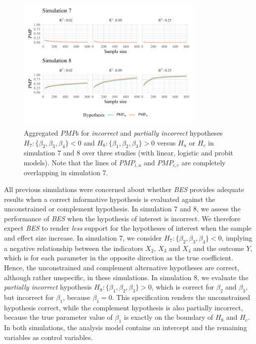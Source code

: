 \documentclass[
  authoryear,
  preprint,
  5p,
  twocolumn]{elsarticle}
\begin{document}
\begin{figure}

{\centering \includegraphics[width=0.81\textwidth,height=\textheight]{manuscript_volker_files/figure-pdf/fig-sim78-2.pdf}

}

\caption{\label{fig-sim78-2}Aggregated \(PMP\)s for \textit{incorrect}
and \textit{partially incorrect} hypotheses
\(H_7: \{\beta_2, \beta_3, \beta_4\} < 0\) and
\(H_8: \{\beta_1, \beta_2, \beta_3\} > 0\) versus \(H_u\) or \(H_c\) in
simulation 7 and 8 over three studies (with linear, logistic and probit
models). Note that the lines of \(PMP_{i,u}\) and \(PMP_{i,c}\) are
completely overlapping in simulation 7.}

\end{figure}

All previous simulations were concerned about whether \emph{BES}
provides adequate results when a correct informative hypothesis is
evaluated against the unconstrained or complement hypothesis. In
simulation 7 and 8, we assess the performance of \emph{BES} when the
hypothesis of interest is incorrect. We therefore expect \emph{BES} to
render \emph{less} support for the hypotheses of interest when the
sample and effect size increase. In simulation 7, we consider
\(H_7: \{\beta_2, \beta_3, \beta_4\} < 0\), implying a negative
relationship between the indicators \(X_2\), \(X_3\) and \(X_4\) and the
outcome \(Y\), which is for each parameter in the opposite direction as
the true coefficient. Hence, the unconstrained and complement
alternative hypotheses are correct, although rather unspecific, in these
simulations. In simulation 8, we evaluate the \emph{partially incorrect}
hypothesis \(H_8: \{\beta_1, \beta_2, \beta_3\} > 0\), which is correct
for \(\beta_2\) and \(\beta_3\), but incorrect for \(\beta_1\), because
\(\beta_1 = 0\). This specification renders the unconstrained hypothesis
correct, while the complement hypothesis is also partially incorrect,
because the true parameter value of \(\beta_1\) is exactly on the
boundary of \(H_8\) and \(H_c\). In both simulations, the analysis model
contains an intercept and the remaining variables as control variables.
\end{document}
